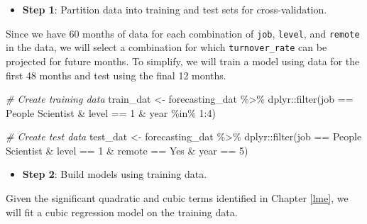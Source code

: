 \documentclass[
]{book}
\newenvironment{Shaded}{\begin{snugshade}}{\end{snugshade}}
\newcommand{\CommentTok}[1]{\textcolor[rgb]{0.56,0.35,0.01}{\textit{#1}}}
\newcommand{\DecValTok}[1]{\textcolor[rgb]{0.00,0.00,0.81}{#1}}
\newcommand{\FunctionTok}[1]{\textcolor[rgb]{0.00,0.00,0.00}{#1}}
\newcommand{\NormalTok}[1]{#1}
\newcommand{\OtherTok}[1]{\textcolor[rgb]{0.56,0.35,0.01}{#1}}
\newcommand{\SpecialCharTok}[1]{\textcolor[rgb]{0.00,0.00,0.00}{#1}}
\newcommand{\StringTok}[1]{\textcolor[rgb]{0.31,0.60,0.02}{#1}}
\providecommand{\tightlist}{%
  \setlength{\itemsep}{0pt}\setlength{\parskip}{0pt}}
\begin{document}
\begin{itemize}
\tightlist
\item
  \textbf{Step 1}: Partition data into training and test sets for cross-validation.
\end{itemize}

Since we have 60 months of data for each combination of \texttt{job}, \texttt{level}, and \texttt{remote} in the data, we will select a combination for which \texttt{turnover\_rate} can be projected for future months. To simplify, we will train a model using data for the first 48 months and test using the final 12 months.

\begin{Shaded}
\begin{Highlighting}[]
\CommentTok{\# Create training data}
\NormalTok{train\_dat }\OtherTok{\textless{}{-}}\NormalTok{ forecasting\_dat }\SpecialCharTok{\%\textgreater{}\%}\NormalTok{ dplyr}\SpecialCharTok{::}\FunctionTok{filter}\NormalTok{(job }\SpecialCharTok{==} \StringTok{\textquotesingle{}People Scientist\textquotesingle{}} \SpecialCharTok{\&}\NormalTok{ level }\SpecialCharTok{==} \DecValTok{1} \SpecialCharTok{\&}\NormalTok{ year }\SpecialCharTok{\%in\%} \DecValTok{1}\SpecialCharTok{:}\DecValTok{4}\NormalTok{)}

\CommentTok{\# Create test data}
\NormalTok{test\_dat }\OtherTok{\textless{}{-}}\NormalTok{ forecasting\_dat }\SpecialCharTok{\%\textgreater{}\%}\NormalTok{ dplyr}\SpecialCharTok{::}\FunctionTok{filter}\NormalTok{(job }\SpecialCharTok{==} \StringTok{\textquotesingle{}People Scientist\textquotesingle{}} \SpecialCharTok{\&}\NormalTok{ level }\SpecialCharTok{==} \DecValTok{1} \SpecialCharTok{\&}\NormalTok{ remote }\SpecialCharTok{==} \StringTok{\textquotesingle{}Yes\textquotesingle{}} \SpecialCharTok{\&}\NormalTok{ year }\SpecialCharTok{==} \DecValTok{5}\NormalTok{)}
\end{Highlighting}
\end{Shaded}

\begin{itemize}
\tightlist
\item
  \textbf{Step 2}: Build models using training data.
\end{itemize}

Given the significant quadratic and cubic terms identified in Chapter \ref{lme}, we will fit a cubic regression model on the training data.
\end{document}
